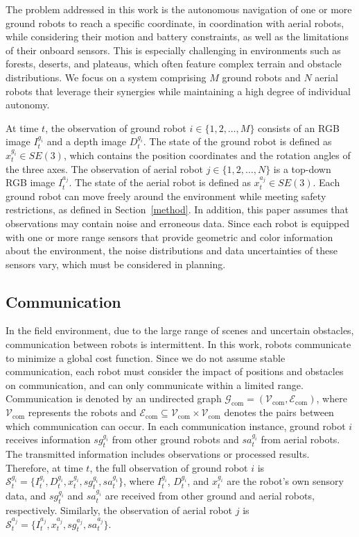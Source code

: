 The problem addressed in this work is the autonomous navigation of one or more ground robots to reach a specific coordinate, in coordination with aerial robots, while considering their motion and battery constraints, as well as the limitations of their onboard sensors. This is especially challenging in environments such as forests, deserts, and plateaus, which often feature complex terrain and obstacle distributions. We focus on a system comprising $M$ ground robots and $N$ aerial robots that leverage their synergies while maintaining a high degree of individual autonomy.

At time $t$, the observation of ground robot $i \in \{1, 2, \dots, M\}$ consists of an RGB image $I_{t}^{g_i}$ and a depth image $D_{t}^{g_i}$. The state of the ground robot is defined as $x_t^{g_i} \in SE(3)$, which contains the position coordinates and the rotation angles of the three axes. The observation of aerial robot $j \in \{1, 2, \dots, N\}$ is a top-down RGB image $I_{t}^{a_j}$. The state of the aerial robot is defined as $x_t^{a_j} \in SE(3)$. Each ground robot can move freely around the environment while meeting safety restrictions, as defined in Section~\ref{method}. In addition, this paper assumes that observations may contain noise and erroneous data. Since each robot is equipped with one or more range sensors that provide geometric and color information about the environment, the noise distributions and data uncertainties of these sensors vary, which must be considered in planning.

\subsection{Communication}

In the field environment, due to the large range of scenes and uncertain obstacles, communication between robots is intermittent. In this work, robots communicate to minimize a global cost function. Since we do not assume stable communication, each robot must consider the impact of positions and obstacles on communication, and can only communicate within a limited range. Communication is denoted by an undirected graph $\mathcal{G}_{\mathrm{com}} = (\mathcal{V}_{\mathrm{com}}, \mathcal{E}_{\mathrm{com}})$, where $\mathcal{V}_{\mathrm{com}}$ represents the robots and $\mathcal{E}_{\mathrm{com}} \subseteq \mathcal{V}_{\mathrm{com}} \times \mathcal{V}_{\mathrm{com}}$ denotes the pairs between which communication can occur. In each communication instance, ground robot $i$ receives information $sg_{t}^{g_i}$ from other ground robots and $sa_{t}^{g_i}$ from aerial robots. The transmitted information includes observations or processed results. Therefore, at time $t$, the full observation of ground robot $i$ is $\mathcal{S}_t^{g_i} = \{I_{t}^{g_i}, D_{t}^{g_i}, x_t^{g_i}, sg_t^{g_i}, sa_t^{g_i}\}$, where $I_t^{g_i}$, $D_t^{g_i}$, and $x_t^{g_i}$ are the robot's own sensory data, and $sg_t^{g_i}$ and $sa_t^{g_i}$ are received from other ground and aerial robots, respectively. Similarly, the observation of aerial robot $j$ is $\mathcal{S}_t^{a_j} = \{I_{t}^{a_j}, x_t^{a_j}, sg_t^{a_j}, sa_t^{a_j}\}$.

